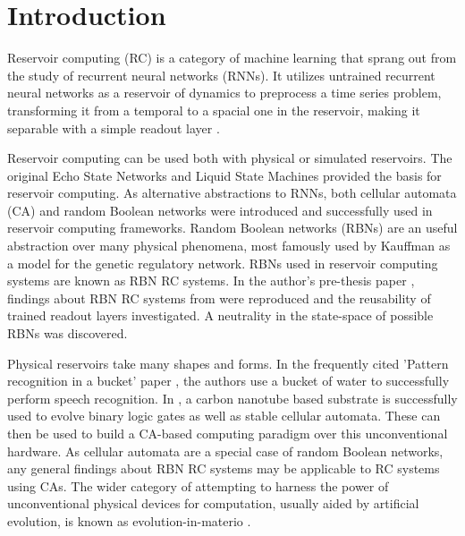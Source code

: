 \chapter{Introduction}

Reservoir computing (RC) is a category of machine learning that sprang out from the study of recurrent neural networks (RNNs).
It utilizes untrained recurrent neural networks as a reservoir of dynamics to preprocess a time series problem,
transforming it from a temporal to a spacial one in the reservoir,
making it separable with a simple readout layer \cite{lukovsevivcius2012reservoir}.

Reservoir computing can be used both with physical or simulated reservoirs.
The original Echo State Networks \cite{jaeger2002adaptive} and Liquid State Machines \cite{natschlager2002liquid} provided the basis for reservoir computing.
As alternative abstractions to RNNs,
both cellular automata (CA) \cite{yilmaz2014reservoir} and random Boolean networks \cite{rbn-reservoir} were introduced and successfully used in reservoir computing frameworks.
Random Boolean networks (RBNs) \cite{gershenson2004introduction} are an useful abstraction over many physical phenomena,
most famously used by Kauffman \cite{kauffman1969metabolic} as a model for the genetic regulatory network.
RBNs used in reservoir computing systems are known as RBN RC systems.
In the author's pre-thesis paper \cite{burkow2015evolving},
findings about RBN RC systems from \cite{rbn-reservoir} were reproduced and the reusability of trained readout layers investigated.
A neutrality in the state-space of possible RBNs was discovered.

Physical reservoirs take many shapes and forms.
In the frequently cited 'Pattern recognition in a bucket' paper \cite{fernando2003pattern},
the authors use a bucket of water to successfully perform speech recognition.
In \cite{farstad2015evolving},
a carbon nanotube based substrate is successfully used to evolve binary logic gates as well as stable cellular automata.
These can then be used to build a CA-based computing paradigm over this unconventional hardware.
As cellular automata are a special case of random Boolean networks,
any general findings about RBN RC systems may be applicable to RC systems using CAs.
The wider category of attempting to harness the power of unconventional physical devices for computation,
usually aided by artificial evolution,
is known as evolution-in-materio \cite{miller2002evolution}.

